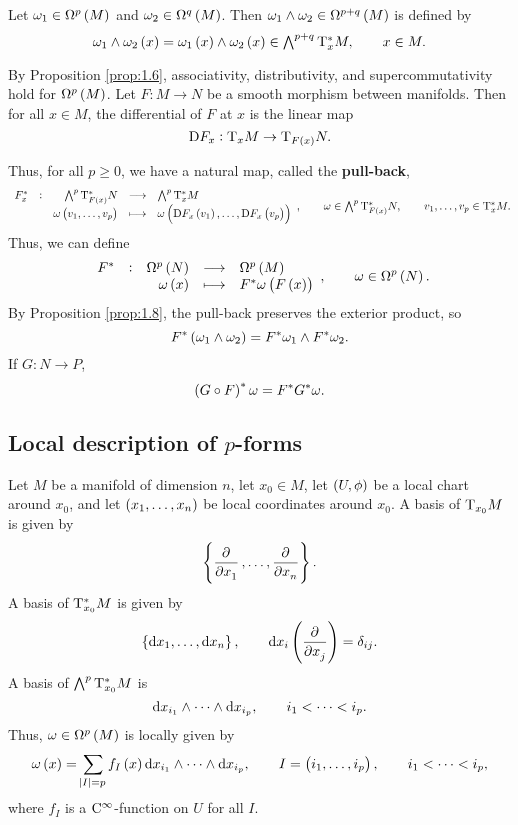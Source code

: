 \begin{definition}
Let $ \omega_1 \in \Omega^p\br{M} $ and $ \omega_2 \in \Omega^q\br{M} $. Then $ \omega_1 \wedge \omega_2 \in \Omega^{p + q}\br{M} $ is defined by
$$ \omega_1 \wedge \omega_2\br{x} = \omega_1\br{x} \wedge \omega_2\br{x} \in \textstyle\bigwedge^{p + q}\T_x^*M, \qquad x \in M. $$
\end{definition}

By Proposition \ref{prop:1.6}, associativity, distributivity, and supercommutativity hold for $ \Omega^p\br{M} $. Let $ F : M \to N $ be a smooth morphism between manifolds. Then for all $ x \in M $, the differential of $ F $ at $ x $ is the linear map
$$ \D F_x : \T_xM \to \T_{F\br{x}}N. $$

\pagebreak

Thus, for all $ p \ge 0 $, we have a natural map, called the \textbf{pull-back},
$$ \function[F_x^*]{\bigwedge^p\T_{F\br{x}}^*N}{\bigwedge^p\T_x^*M}{\omega\br{v_1, \dots, v_p}}{\omega\br{\D F_x\br{v_1}, \dots, \D F_x\br{v_p}}}, \qquad \omega \in \textstyle\bigwedge^p\T_{F\br{x}}^*N, \qquad v_1, \dots, v_p \in \T_x^*M. $$
Thus, we can define
$$ \function[F^*]{\Omega^p\br{N}}{\Omega^p\br{M}}{\omega\br{x}}{F^*\omega\br{F\br{x}}}, \qquad \omega \in \Omega^p\br{N}. $$
By Proposition \ref{prop:1.8}, the pull-back preserves the exterior product, so
$$ F^*\br{\omega_1 \wedge \omega_2} = F^*\omega_1 \wedge F^*\omega_2. $$
If $ G : N \to P $,
$$ \br{G \circ F}^*\omega = F^*G^*\omega. $$

\subsection{Local description of \texorpdfstring{$ p $}{p}-forms}

Let $ M $ be a manifold of dimension $ n $, let $ x_0 \in M $, let $ \br{U, \phi} $ be a local chart around $ x_0 $, and let $ \br{x_1, \dots, x_n} $ be local coordinates around $ x_0 $. A basis of $ \mathrm{T}_{x_0}M $ is given by
$$ \cbr{\dpd{}{x_1}, \dots, \dpd{}{x_n}}. $$
A basis of $ \mathrm{T}_{x_0}^*M $ is given by
$$ \cbr{\d x_1, \dots, \d x_n}, \qquad \d x_i\br{\dpd{}{x_j}} = \delta_{ij}. $$
A basis of $ \bigwedge^p\mathrm{T}_{x_0}^*M $ is
$$ \mathrm{d} x_{i_1} \wedge \dots \wedge \mathrm{d} x_{i_p}, \qquad i_1 < \dots < i_p. $$
Thus, $ \omega \in \Omega^p\br{M} $ is locally given by
$$ \omega\br{x} = \sum_{\abs{I} = p} f_I\br{x}\d x_{i_1} \wedge \dots \wedge \d x_{i_p}, \qquad I = \br{i_1, \dots, i_p}, \qquad i_1 < \dots < i_p, $$
where $ f_I $ is a $ \mathrm{C}^\infty $-function on $ U $ for all $ I $.

